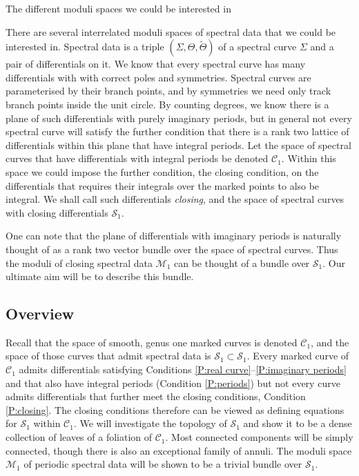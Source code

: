 The different moduli spaces we could be interested in

There are several interrelated moduli spaces of spectral data that we could be interested in. Spectral data is a triple $(Σ,Θ,\tilde{Θ})$ of a spectral curve $Σ$ and a pair of differentials on it. We know that every spectral curve has many differentials with with correct poles and symmetries. Spectral curves are parameterised by their branch points, and by symmetries we need only track branch points inside the unit circle. By counting degrees, we know there is a plane of such differentials with purely imaginary periods, but in general not every spectral curve will satisfy the further condition that there is a rank two lattice of differentials within this plane that have integral periods. Let the space of spectral curves that have differentials with integral periods be denoted $\mathcal{C}_1$. Within this space we could impose the further condition, the closing condition, on the differentials that requires their integrals over the marked points to also be integral. We shall call such differentials \emph{closing}, and the space of spectral curves with closing differentials $\mathcal{S}_1$.

One can note that the plane of differentials with imaginary periods is naturally thought of as a rank two vector bundle over the space of spectral curves. Thus the moduli of closing spectral data $\mathcal{M}_1$ can be thought of a bundle over $\mathcal{S}_1$. Our ultimate aim will be to describe this bundle.










\subsection{Overview}
\label{sub:Overview}

Recall that the space of smooth, genus one marked curves is denoted $\mathcal{C}_1$, and the space of those curves that admit spectral data is $\mathcal{S}_1 \subset \mathcal{S}_1$. Every marked curve of $\mathcal{C}_1$ admits differentials satisfying Conditions \ref{P:real curve}--\ref{P:imaginary periods} and that also have integral periods (Condition \ref{P:periods}) but not every curve admits differentials that further meet the closing conditions, Condition \ref{P:closing}. The closing conditions therefore can be viewed as defining equations for $\mathcal{S}_1$ within $\mathcal{C}_1$. We will investigate the topology of $\mathcal{S}_1$ and show it to be a dense collection of leaves of a foliation of $\mathcal{C}_1$. Most connected components will be simply connected, though there is also an exceptional family of annuli. The moduli space $\mathcal{M}_1$ of periodic spectral data will be shown to be a trivial bundle over $\mathcal{S}_1$.

